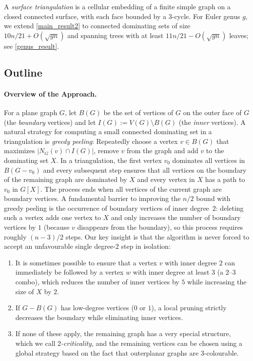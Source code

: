 \documentclass{patmorin}
\newcommand{\defin}[1]{\emph{\textcolor{brightmaroon}{#1}}}
\begin{document}
A \defin{surface triangulation} is a cellular embedding of a finite simple
graph on a closed connected surface, with each face bounded by a $3$-cycle.
For Euler genus $g$, we extend \cref{main_result2} to connected dominating sets 
of size $10n/21+O(\sqrt{gn})$ and spanning trees with at least
$11n/21-O(\sqrt{gn})$ leaves; see \cref{genus_result}.

\subsection{Outline}

\paragraph{Overview of the Approach.}
For a plane graph $G$, let $B(G)$ be the set of vertices of $G$ on the outer face of $G$ (the \defin{boundary} vertices) and let $I(G):=V(G)\setminus B(G)$ (the \defin{inner} vertices).
A natural strategy for computing a small connected dominating set in a triangulation is \defin{greedy peeling}: Repeatedly choose a vertex $v\in B(G)$ that maximizes $|N_G(v)\cap I(G)|$, remove $v$ from the graph and add $v$ to the dominating set $X$. In a triangulation, the first vertex $v_0$ dominates all vertices in $B(G-v_0)$ and every subsequent step ensures that all vertices on the boundary of the remaining graph are dominated by $X$ and every vertex in $X$ has a path to $v_0$ in $G[X]$. The process ends when all vertices of the current graph are boundary vertices.  A fundamental barrier to improving the $n/2$ bound with greedy peeling is the occurrence of boundary vertices of inner degree~$2$: deleting such a vertex adds one vertex to $X$ and only increases the number of boundary vertices by $1$ (because $v$ disappears from the boundary), so this process requires roughly $(n-3)/2$ steps. Our key insight is that the algorithm is never forced to accept an unfavourable single degree-$2$ step in isolation:
\begin{enumerate}[label=\rm(\arabic*),nosep,nolistsep]
  \item It is sometimes possible to ensure that a vertex $v$ with inner degree $2$ can immediately be followed by a vertex $w$ with inner degree at least $3$ (a $2$--$3$ combo), which reduces the number of inner vertices by $5$ while increasing the size of $X$ by $2$.
  \item If $G - B(G)$ has low-degree vertices ($0$ or $1$), a local pruning strictly decreases the boundary while eliminating inner vertices.
  \item If none of these apply, the remaining graph has a very special structure, which we call \defin{$2$-criticality}, and the remaining vertices can be chosen using a global strategy based on the fact that outerplanar graphs are $3$-colourable.
\end{enumerate}
\end{document}
